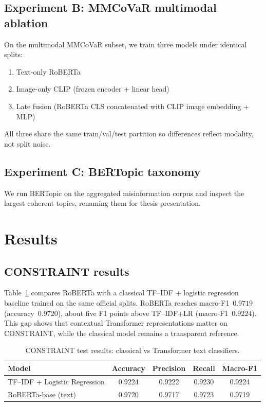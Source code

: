 \documentclass[12pt, a4paper]{report}
\begin{document}
\subsection{Experiment B: MMCoVaR multimodal ablation}

On the multimodal MMCoVaR subset, we train three models under identical splits:
\begin{enumerate}
  \item Text-only RoBERTa
  \item Image-only CLIP (frozen encoder + linear head)
  \item Late fusion (RoBERTa CLS concatenated with CLIP image embedding + MLP)
\end{enumerate}
All three share the same train/val/test partition so differences reflect modality, not split noise.

\subsection{Experiment C: BERTopic taxonomy}

We run BERTopic on the aggregated misinformation corpus and inspect the largest coherent topics, renaming them for thesis presentation.

\section{Results}
\label{sec:results}

\subsection{CONSTRAINT results}

Table~\ref{tab:constraint-results} compares RoBERTa with a classical TF--IDF + logistic regression baseline trained on the same official splits.
RoBERTa reaches macro-F1~$0.9719$ (accuracy~$0.9720$), about five F1 points above TF--IDF+LR (macro-F1~$0.9224$).
This gap shows that contextual Transformer representations matter on CONSTRAINT, while the classical model remains a transparent reference.

\begin{table}[htbp]
\centering
\caption{CONSTRAINT test results: classical vs Transformer text classifiers.}
\label{tab:constraint-results}
\begin{tabular}{lcccc}
\hline
Model & Accuracy & Precision & Recall & Macro-F1 \\
\hline
TF--IDF + Logistic Regression & 0.9224 & 0.9222 & 0.9230 & 0.9224 \\
RoBERTa-base (text) & 0.9720 & 0.9717 & 0.9723 & 0.9719 \\
\hline
\end{tabular}
\end{table}
\end{document}
